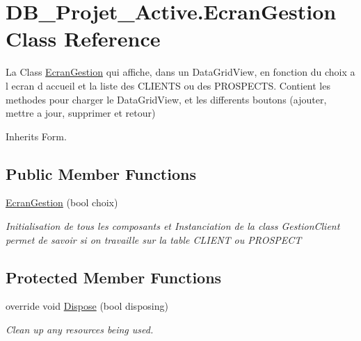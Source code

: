 \hypertarget{class_d_b___projet___active_1_1_ecran_gestion}{}\section{D\+B\+\_\+\+Projet\+\_\+\+Active.\+Ecran\+Gestion Class Reference}
\label{class_d_b___projet___active_1_1_ecran_gestion}


La Class \mbox{\hyperlink{class_d_b___projet___active_1_1_ecran_gestion}{Ecran\+Gestion}} qui affiche, dans un Data\+Grid\+View, en fonction du choix a l ecran d accueil et la liste des C\+L\+I\+E\+N\+TS ou des P\+R\+O\+S\+P\+E\+C\+TS. Contient les methodes pour charger le Data\+Grid\+View, et les differents boutons (ajouter, mettre a jour, supprimer et retour)  




Inherits Form.

\subsection*{Public Member Functions}
\begin{DoxyCompactItemize}
\item 
\mbox{\hyperlink{class_d_b___projet___active_1_1_ecran_gestion_a273feee2e71a07ebae1144b2fd37c57f}{Ecran\+Gestion}} (bool choix)
\begin{DoxyCompactList}\small\item\em Initialisation de tous les composants et Instanciation de la class Gestion\+Client permet de savoir si on travaille sur la table C\+L\+I\+E\+NT ou P\+R\+O\+S\+P\+E\+CT \end{DoxyCompactList}\end{DoxyCompactItemize}
\subsection*{Protected Member Functions}
\begin{DoxyCompactItemize}
\item 
override void \mbox{\hyperlink{class_d_b___projet___active_1_1_ecran_gestion_a6f1c94cfbefe9762eb36e15b30776869}{Dispose}} (bool disposing)
\begin{DoxyCompactList}\small\item\em Clean up any resources being used. \end{DoxyCompactList}\end{DoxyCompactItemize}
